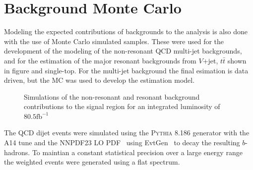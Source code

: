 \section{Background Monte Carlo} \label{sec:data:bkg_mc}

Modeling the expected contributions of backgrounds to the analysis is also done
with the use of Monte Carlo simulated samples.  These were used for the
development of the modeling of the non-resonant QCD multi-jet backgrounds, and
for the estimation of the major resonant backgrounds from $V$+jet, $t\bar{t}$
shown in figure  and single-top.  For the
multi-jet background the final esimation is data driven, but the MC was used to
develop the estimation model.

\begin{figure}[!htbp]
  \centering
   \hfill
  \caption{Simulations of the non-resonant and resonant background contributions to the signal region for an integrated luminosity of $80.5\text{fb}^{-1}$}
  \label{simulated_background_shapes}
\end{figure}

The QCD dijet events were simulated using the \textsc{Pythia} 8.186
\cite{Sjostrand:2007gs} generator with the A14 tune and the NNPDF23 LO
PDF~\cite{Carrazza:2013axa} using EvtGen~\cite{LANGE2001152} to decay
the resulting $b$-hadrons.  To maintian a constant statistical precision over
a large energy range the weighted events were generated using a flat \pT
spectrum.

